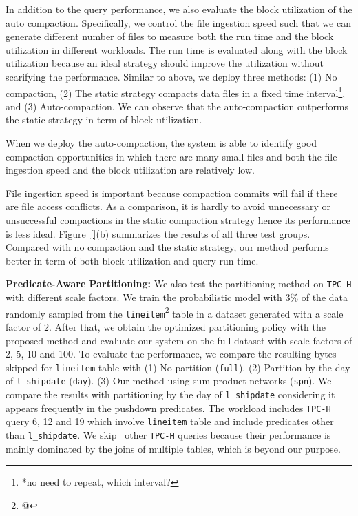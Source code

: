 In addition to the query performance, we also evaluate the block utilization of the auto compaction. Specifically, we control the file ingestion speed such that we can generate different number of files to measure both the run time and the block utilization in different workloads. The run time is evaluated along with the block utilization because an ideal strategy should improve the utilization without scarifying the performance. Similar to above, we deploy three methods: (1) No compaction, (2) The static strategy compacts data files in a fixed time interval\footnote{*no need to repeat, which interval?}, and (3) Auto-compaction. We can observe that the auto-compaction outperforms the static strategy in term of block utilization. 




When we deploy the auto-compaction, the system is able to identify good compaction opportunities in which there are many small files and both the file ingestion speed and the block utilization are relatively low. 

File ingestion speed is important because compaction commits will fail if there are file access conflicts. As a comparison, it is hardly to avoid unnecessary or unsuccessful compactions in the static compaction strategy hence its performance is less ideal. Figure~\ref{}(b) summarizes the results of all three test groups. Compared with no compaction and the static  strategy, our method performs better in term of both block utilization and query run time.


\noindent \textbf{Predicate-Aware Partitioning:} We also test the partitioning method on \texttt{TPC-H}  with different scale factors. We train the probabilistic model with 3\% of the data randomly sampled from the \texttt{lineitem}\footnote{@} table in a dataset generated with a scale factor of 2. After that, we obtain the optimized partitioning policy with the proposed method and evaluate our system on the full dataset with scale factors of 2, 5, 10 and 100. To evaluate the performance, we compare the resulting bytes skipped for \texttt{lineitem} table with (1) No partition (\texttt{full}). (2) Partition by the day of \texttt{l\_shipdate} (\texttt{day}).  (3) Our  method using sum-product networks (\texttt{spn}).
 We compare the results with partitioning by the day of \texttt{l\_shipdate} considering it appears frequently in the pushdown predicates. The workload includes \texttt{TPC-H} query 6, 12 and 19 which involve \texttt{lineitem} table and include predicates other than \texttt{l\_shipdate}. We skip \ other \texttt{TPC-H} queries because their performance is  mainly dominated by the joins of multiple tables, which is beyond our purpose.

